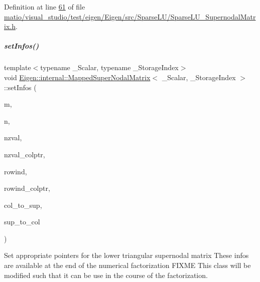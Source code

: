 Definition at line \hyperlink{matio_2visual__studio_2test_2eigen_2_eigen_2src_2_sparse_l_u_2_sparse_l_u___supernodal_matrix_8h_source_l00061}{61} of file \hyperlink{matio_2visual__studio_2test_2eigen_2_eigen_2src_2_sparse_l_u_2_sparse_l_u___supernodal_matrix_8h_source}{matio/visual\+\_\+studio/test/eigen/\+Eigen/src/\+Sparse\+L\+U/\+Sparse\+L\+U\+\_\+\+Supernodal\+Matrix.\+h}.

\mbox{\label{group___sparse_l_u___module_af1427486564e2c75b9da68f98bd04e63}} 
\subparagraph{\texorpdfstring{set\+Infos()}{setInfos()}\hspace{0.1cm}{\footnotesize\ttfamily [2/2]}}
{\footnotesize\ttfamily template$<$typename \+\_\+\+Scalar, typename \+\_\+\+Storage\+Index$>$ \\
void \hyperlink{group___sparse_l_u___module_class_eigen_1_1internal_1_1_mapped_super_nodal_matrix}{Eigen\+::internal\+::\+Mapped\+Super\+Nodal\+Matrix}$<$ \+\_\+\+Scalar, \+\_\+\+Storage\+Index $>$\+::set\+Infos (\begin{DoxyParamCaption}\item[{\hyperlink{namespace_eigen_a62e77e0933482dafde8fe197d9a2cfde}{Index}}]{m,  }\item[{\hyperlink{namespace_eigen_a62e77e0933482dafde8fe197d9a2cfde}{Index}}]{n,  }\item[{\hyperlink{group___core___module}{Scalar\+Vector} \&}]{nzval,  }\item[{\hyperlink{group___core___module}{Index\+Vector} \&}]{nzval\+\_\+colptr,  }\item[{\hyperlink{group___core___module}{Index\+Vector} \&}]{rowind,  }\item[{\hyperlink{group___core___module}{Index\+Vector} \&}]{rowind\+\_\+colptr,  }\item[{\hyperlink{group___core___module}{Index\+Vector} \&}]{col\+\_\+to\+\_\+sup,  }\item[{\hyperlink{group___core___module}{Index\+Vector} \&}]{sup\+\_\+to\+\_\+col }\end{DoxyParamCaption})\hspace{0.3cm}{\ttfamily [inline]}}

Set appropriate pointers for the lower triangular supernodal matrix These infos are available at the end of the numerical factorization F\+I\+X\+ME This class will be modified such that it can be use in the course of the factorization. 

